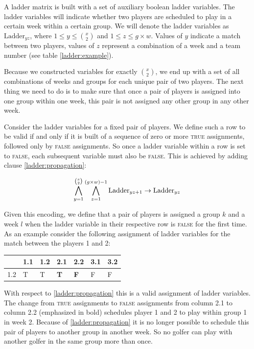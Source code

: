 \documentclass[a4paper]{scrartcl}
\begin{document}
A ladder matrix is built with a set of auxiliary boolean ladder variables. The ladder variables will indicate whether two players are scheduled to play in a certain week within a certain group. We will denote the ladder variables as $\text{Ladder}_{yz}$, where $1 \leq y \leq {x \choose 2}$ and $1 \leq z \leq g \times w$. Values of $y$ indicate a match between two players, values of $z$ represent a combination of a week and a team number (see table \ref{ladder:example}). 



Because we constructed variables for exactly ${x \choose 2}$, we end up with a set of all combinations of weeks and groups for each unique pair of two players. The next thing we need to do is to make sure that once a pair of players is assigned into one group within one week, this pair is not assigned any other group in any other week.

Consider the ladder variables for a fixed pair of players. We define such a row to be valid if and only if it is built of a sequence of zero or more \textsc{true} assignments, followed only by \textsc{false} assignments. So once a ladder variable within a row is set to \textsc{false}, each subsequent variable must also be \textsc{false}. This is achieved by adding clause \ref{ladder:propagation}:

\begin{equation}
\label{ladder:propagation}
\centering
    \bigwedge \limits_{y=1}^{{x \choose 2}}
    \bigwedge \limits_{z=1}^{(g \times w)-1}
    \text{Ladder}_{yz+1}
    \to
    \text{Ladder}_{yz}
\end{equation}

Given this encoding, we define that a pair of players is assigned a group $k$ and a week $l$ when the ladder variable in their respective row is \textsc{false} for the first time. As an example consider the following assignment of ladder variables for the match between the players 1 and 2:

\begin{table}[h]
\centering
\begin{tabular}{ l | l | l | l | l | l | l }
    & 1.1 & 1.2 & 2.1 & 2.2 & 3.1 & 3.2 \\
\hline
1.2 & T & T & \textbf{T} & \textbf{F} & F & F \\
\end{tabular}
\end{table}

With respect to \ref{ladder:propagation} this is a valid assignment of ladder variables. The change from \textsc{true} assignments to \textsc{false} assignments from column 2.1 to column 2.2 (emphasized in bold) schedules player 1 and 2 to play within group 1 in week 2. Because of \ref{ladder:propagation} it is no longer possible to schedule this pair of players to another group in another week. So no golfer can play with another golfer in the same group more than once.
\end{document}
